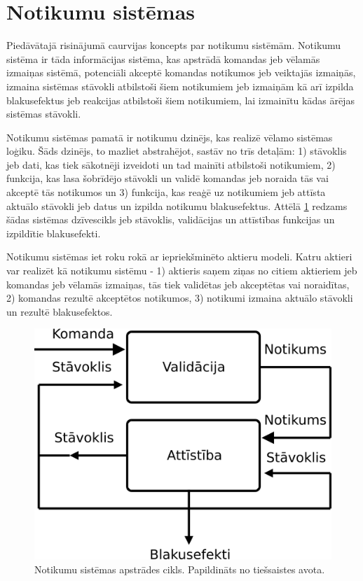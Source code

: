 \section{Notikumu sistēmas}

Piedāvātajā risinājumā caurvijas koncepts par notikumu sistēmām. Notikumu
sistēma ir tāda informācijas sistēma, kas apstrādā komandas jeb vēlamās izmaiņas
sistēmā, potenciāli akceptē komandas notikumos jeb veiktajās izmaiņās, izmaina
sistēmas stāvokli atbilstoši šiem notikumiem jeb  izmaiņām kā arī izpilda
blakusefektus jeb reakcijas atbilstoši šiem notikumiem, lai izmainītu kādas
ārējas sistēmas stāvokli.
\cite[para. 3.2.3]{JohnsenEspen2018}

Notikumu sistēmas pamatā ir notikumu dzinējs, kas realizē vēlamo sistēmas
loģiku. Šāds dzinējs, to mazliet abstrahējot, sastāv no trīs detaļām: 1)
stāvoklis jeb dati, kas tiek sākotnēji izveidoti un tad mainīti atbilstoši
notikumiem, 2) funkcija, kas lasa šobrīdējo stāvokli un validē komandas jeb
noraida tās vai akceptē tās notikumos un 3) funkcija, kas reaģē uz notikumiem
jeb attīsta aktuālo stāvokli jeb datus un izpilda notikumu blakusefektus. Attēlā
\ref{fig:eventengine} redzams šādas sistēmas dzīvescikls jeb stāvoklis,
validācijas un attīstības funkcijas un izpildītie blakusefekti.

Notikumu sistēmas iet roku rokā ar iepriekšminēto aktieru modeli. Katru aktieri
var realizēt kā notikumu sistēmu - 1) aktieris saņem ziņas no citiem aktieriem
jeb komandas jeb vēlamās izmaiņas, tās tiek validētas jeb akceptētas vai
noraidītas, 2) komandas rezultē akceptētos notikumos, 3) notikumi izmaina
aktuālo stāvokli un rezultē blakusefektos. 

\begin{figure}[H]
    \includegraphics[width=0.5\linewidth]{assets/event-sourcing-decider.png}
    \centering
    \caption{Notikumu sistēmas apstrādes cikls. Papildināts no tiešsaistes avota. \cite{JeremieChassaing2021}}
    \label{fig:eventengine}
\end{figure}

